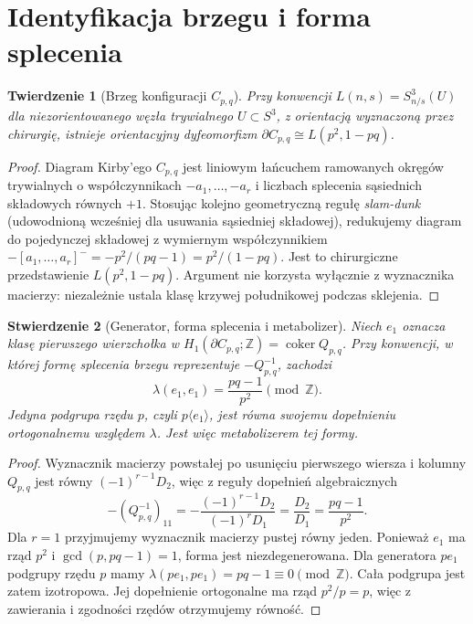 \documentclass[11pt,a4paper]{report}
\numberwithin{equation}{section}
\theoremstyle{plain}
\newtheorem{twierdzenie}{Twierdzenie}[section]
\newtheorem{stwierdzenie}[twierdzenie]{Stwierdzenie}
\theoremstyle{definition}
\theoremstyle{remark}
\begin{document}
\section{Identyfikacja brzegu i forma splecenia}
\label{sec:tg-general-boundary}

\begin{twierdzenie}[Brzeg konfiguracji $C_{p,q}$]
\label{thm:tg-general-lens}
Przy konwencji $L(n,s)=S^3_{n/s}(U)$ dla
niezorientowanego węzła trywialnego $U\subset S^3$,
z orientacją wyznaczoną przez chirurgię, istnieje
orientacyjny dyfeomorfizm
$\partial C_{p,q}\cong L(p^2,1-pq)$.
\end{twierdzenie}

\begin{proof}
Diagram Kirby'ego $C_{p,q}$ jest liniowym łańcuchem
ramowanych okręgów trywialnych o współczynnikach
$-a_1,\ldots,-a_r$ i liczbach splecenia sąsiednich
składowych równych $+1$.
Stosując kolejno geometryczną regułę \emph{slam-dunk}
(udowodnioną wcześniej dla usuwania sąsiedniej składowej),
redukujemy diagram do pojedynczej składowej z wymiernym
współczynnikiem
$-[a_1,\ldots,a_r]^-= -p^2/(pq-1)=p^2/(1-pq)$.
Jest to chirurgiczne przedstawienie $L(p^2,1-pq)$.
Argument nie korzysta wyłącznie z wyznacznika macierzy:
niezależnie ustala klasę krzywej południkowej podczas sklejenia.
\end{proof}

\begin{stwierdzenie}[Generator, forma splecenia i metabolizer]
\label{prop:tg-general-linking}
Niech $e_1$ oznacza klasę pierwszego wierzchołka w
$H_1(\partial C_{p,q};\mathbb Z)=\operatorname{coker}Q_{p,q}$.
Przy konwencji, w której formę splecenia brzegu reprezentuje
$-Q_{p,q}^{-1}$, zachodzi
\[
\lambda(e_1,e_1)=\frac{pq-1}{p^2}\pmod{\mathbb Z}.
\]
Jedyna podgrupa rzędu $p$, czyli $p\langle e_1\rangle$,
jest równa swojemu dopełnieniu ortogonalnemu względem
$\lambda$. Jest więc \emph{metabolizerem} tej formy.
\end{stwierdzenie}

\begin{proof}
Wyznacznik macierzy powstałej po usunięciu pierwszego
wiersza i kolumny $Q_{p,q}$ jest równy
$(-1)^{r-1}D_2$, więc z reguły dopełnień algebraicznych
\[
-(Q_{p,q}^{-1})_{11}=
-\frac{(-1)^{r-1}D_2}{(-1)^rD_1}
=\frac{D_2}{D_1}=
\frac{pq-1}{p^2}.
\]
Dla $r=1$ przyjmujemy wyznacznik macierzy pustej równy jeden.
Ponieważ $e_1$ ma rząd $p^2$ i $\gcd(p,pq-1)=1$,
forma jest niezdegenerowana. Dla generatora $pe_1$ podgrupy
rzędu $p$ mamy
$\lambda(pe_1,pe_1)=pq-1\equiv0\pmod{\mathbb Z}$.
Cała podgrupa jest zatem izotropowa.
Jej dopełnienie ortogonalne ma rząd $p^2/p=p$,
więc z zawierania i zgodności rzędów otrzymujemy równość.
\end{proof}
\end{document}
